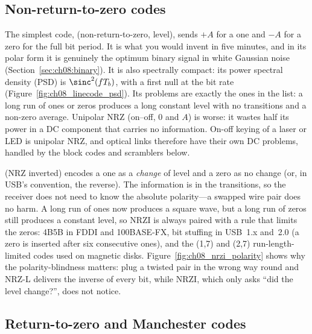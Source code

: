 \subsection{Non-return-to-zero codes}

The simplest code,  (non-return-to-zero, level), sends $+A$ for a one and $-A$
for a zero for the full bit period. It is what you would invent in five minutes, and in its
polar form it is genuinely the optimum binary signal in white Gaussian noise
(Section~\ref{sec:ch08:binary}). It is also spectrally compact: its power spectral density
(PSD) is $\sinc^2(fT_b)$, with a first null at the bit rate
(Figure~\ref{fig:ch08_linecode_psd}). Its problems are exactly the ones in the list: a long
run of ones or zeros produces a long constant level with no transitions and a non-zero
average. Unipolar NRZ (on--off, $0$ and $A$) is worse: it wastes half its power in a DC
component that carries no information. On-off keying of a laser or LED is unipolar NRZ, and
optical links therefore have their own DC problems, handled by the block codes and
scramblers below.

 (NRZ inverted) encodes a one as a \emph{change} of level and a zero as no change
(or, in USB's convention, the reverse). The information is in the transitions, so the
receiver does not need to know the absolute polarity---a swapped wire pair does no harm. A
long run of ones now produces a square wave, but a long run of zeros still produces a
constant level, so NRZI is always paired with a rule that limits the zeros: 4B5B in FDDI and
100BASE-FX, bit stuffing in USB~1.x and~2.0 (a zero is inserted after six consecutive ones),
and the (1,7) and (2,7) run-length-limited codes used on magnetic disks.
Figure~\ref{fig:ch08_nrzi_polarity} shows why the polarity-blindness matters: plug a
twisted pair in the wrong way round and NRZ-L delivers the inverse of every bit, while NRZI,
which only asks ``did the level change?'', does not notice.


\subsection{Return-to-zero and Manchester codes}

